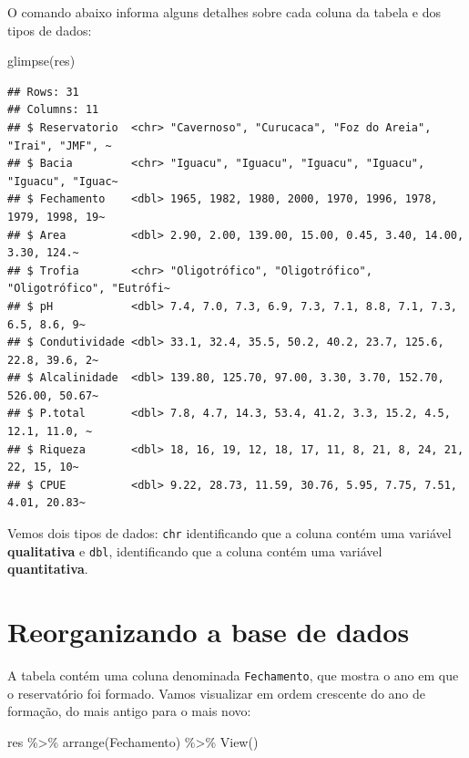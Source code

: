 \documentclass[
]{book}
\newenvironment{Shaded}{\begin{snugshade}}{\end{snugshade}}
\newcommand{\FunctionTok}[1]{\textcolor[rgb]{0.00,0.00,0.00}{#1}}
\newcommand{\NormalTok}[1]{#1}
\newcommand{\SpecialCharTok}[1]{\textcolor[rgb]{0.00,0.00,0.00}{#1}}
\begin{document}
O comando abaixo informa alguns detalhes sobre cada coluna da tabela e dos tipos de dados:

\begin{Shaded}
\begin{Highlighting}[]
\FunctionTok{glimpse}\NormalTok{(res)}
\end{Highlighting}
\end{Shaded}

\begin{verbatim}
## Rows: 31
## Columns: 11
## $ Reservatorio  <chr> "Cavernoso", "Curucaca", "Foz do Areia", "Irai", "JMF", ~
## $ Bacia         <chr> "Iguacu", "Iguacu", "Iguacu", "Iguacu", "Iguacu", "Iguac~
## $ Fechamento    <dbl> 1965, 1982, 1980, 2000, 1970, 1996, 1978, 1979, 1998, 19~
## $ Area          <dbl> 2.90, 2.00, 139.00, 15.00, 0.45, 3.40, 14.00, 3.30, 124.~
## $ Trofia        <chr> "Oligotrófico", "Oligotrófico", "Oligotrófico", "Eutrófi~
## $ pH            <dbl> 7.4, 7.0, 7.3, 6.9, 7.3, 7.1, 8.8, 7.1, 7.3, 6.5, 8.6, 9~
## $ Condutividade <dbl> 33.1, 32.4, 35.5, 50.2, 40.2, 23.7, 125.6, 22.8, 39.6, 2~
## $ Alcalinidade  <dbl> 139.80, 125.70, 97.00, 3.30, 3.70, 152.70, 526.00, 50.67~
## $ P.total       <dbl> 7.8, 4.7, 14.3, 53.4, 41.2, 3.3, 15.2, 4.5, 12.1, 11.0, ~
## $ Riqueza       <dbl> 18, 16, 19, 12, 18, 17, 11, 8, 21, 8, 24, 21, 22, 15, 10~
## $ CPUE          <dbl> 9.22, 28.73, 11.59, 30.76, 5.95, 7.75, 7.51, 4.01, 20.83~
\end{verbatim}

Vemos dois tipos de dados: \texttt{chr} identificando que a coluna contém uma variável \textbf{qualitativa} e \texttt{dbl}, identificando que a coluna contém uma variável \textbf{quantitativa}.

\hypertarget{reorganizando-a-base-de-dados}{%
\section{Reorganizando a base de dados}\label{reorganizando-a-base-de-dados}}

A tabela contém uma coluna denominada \texttt{Fechamento}, que mostra o ano em que o reservatório foi formado. Vamos visualizar em ordem crescente do ano de formação, do mais antigo para o mais novo:

\begin{Shaded}
\begin{Highlighting}[]
\NormalTok{res }\SpecialCharTok{\%\textgreater{}\%} 
  \FunctionTok{arrange}\NormalTok{(Fechamento) }\SpecialCharTok{\%\textgreater{}\%} 
  \FunctionTok{View}\NormalTok{()}
\end{Highlighting}
\end{Shaded}
\end{document}
